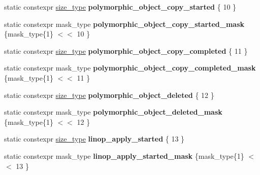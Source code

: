 \begin{DoxyCompactItemize}
\item 
\mbox{\label{classgko_1_1log_1_1Logger_ad7bda1c3dd6f8dc06604394badbf6e60}} 
static constexpr \hyperlink{namespacegko_a6e5c95df0ae4e47aab2f604a22d98ee7}{size\+\_\+type} {\bfseries polymorphic\+\_\+object\+\_\+copy\+\_\+started} \{ 10 \}
\item 
\mbox{\label{classgko_1_1log_1_1Logger_ad0a808521ab4c9d43f05a6f64b5c217e}} 
static constexpr mask\+\_\+type {\bfseries polymorphic\+\_\+object\+\_\+copy\+\_\+started\+\_\+mask} \{mask\+\_\+type\{1\} $<$$<$ 10 \}
\item 
\mbox{\label{classgko_1_1log_1_1Logger_a8f1e63370ddc72caf41e4ee6a5472b79}} 
static constexpr \hyperlink{namespacegko_a6e5c95df0ae4e47aab2f604a22d98ee7}{size\+\_\+type} {\bfseries polymorphic\+\_\+object\+\_\+copy\+\_\+completed} \{ 11 \}
\item 
\mbox{\label{classgko_1_1log_1_1Logger_aefeacec1967311473fbe5c9e57276c75}} 
static constexpr mask\+\_\+type {\bfseries polymorphic\+\_\+object\+\_\+copy\+\_\+completed\+\_\+mask} \{mask\+\_\+type\{1\} $<$$<$ 11 \}
\item 
\mbox{\label{classgko_1_1log_1_1Logger_ab4021d83af3b02b8bd89138c26291873}} 
static constexpr \hyperlink{namespacegko_a6e5c95df0ae4e47aab2f604a22d98ee7}{size\+\_\+type} {\bfseries polymorphic\+\_\+object\+\_\+deleted} \{ 12 \}
\item 
\mbox{\label{classgko_1_1log_1_1Logger_aed7db257d8bf2ac4e08fd7a8ed373c21}} 
static constexpr mask\+\_\+type {\bfseries polymorphic\+\_\+object\+\_\+deleted\+\_\+mask} \{mask\+\_\+type\{1\} $<$$<$ 12 \}
\item 
\mbox{\label{classgko_1_1log_1_1Logger_a24571ab86af4d249d39e28ff4a01c29c}} 
static constexpr \hyperlink{namespacegko_a6e5c95df0ae4e47aab2f604a22d98ee7}{size\+\_\+type} {\bfseries linop\+\_\+apply\+\_\+started} \{ 13 \}
\item 
\mbox{\label{classgko_1_1log_1_1Logger_a2ec5ecc6c40e5eff569b66d4466c11d8}} 
static constexpr mask\+\_\+type {\bfseries linop\+\_\+apply\+\_\+started\+\_\+mask} \{mask\+\_\+type\{1\} $<$$<$ 13 \}

\end{DoxyCompactItemize}
